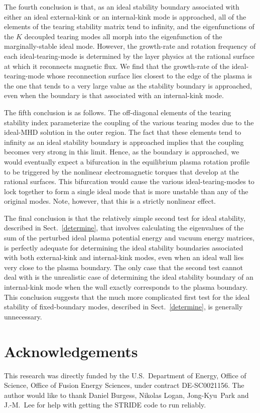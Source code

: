 \documentclass[12pt,prb,aps]{revtex4-1}
\begin{document}
The fourth conclusion is that, as an ideal stability boundary associated with either an ideal external-kink or an internal-kink
mode is approached, all of the elements of the tearing stability matrix tend to infinity, and the eigenfunctions of the $K$ decoupled tearing modes
all morph into the eigenfunction of the marginally-stable ideal mode. However, the growth-rate
and rotation frequency of each ideal-tearing-mode is determined by the layer physics at the rational surface at which it reconnects
magnetic flux. We find that the growth-rate of the ideal-tearing-mode whose reconnection surface lies closest to the edge of the plasma
 is the one that tends to a very large value as the stability boundary is approached, even when the boundary is that associated
with an internal-kink mode. 

The fifth conclusion is as follows. The off-diagonal elements of the tearing stability index parameterize the coupling of the
various tearing modes due to the ideal-MHD solution in the outer region. The fact that these elements tend to infinity as
an ideal stability boundary is approached implies that the coupling becomes very strong in this limit. Hence, as the boundary is
approached, we would eventually expect  a bifurcation in the equilibrium plasma  rotation profile to be triggered  by the nonlinear electromagnetic
torques that develop at the rational surfaces.\cite{am1,bif} This bifurcation would cause the various ideal-tearing-modes to
lock together to form a single ideal mode that is more unstable than any of the original modes. Note, however,  that this is a strictly nonlinear effect. 

The final conclusion is that the relatively simple second test for ideal stability, described in Sect.~\ref{determine}, that involves calculating
the eigenvalues of the sum of the perturbed ideal plasma potential energy and vacuum energy matrices,\cite{dcon} is perfectly adequate for
determining the ideal stability boundaries associated with both external-kink and internal-kink modes, even when an ideal wall lies
very close to the plasma boundary. The only case that the second test cannot deal with is the unrealistic case of determining
the ideal stability boundary of an internal-kink mode when the wall exactly corresponds to the plasma boundary. This conclusion  suggests
that the much more complicated first test for the ideal stability of fixed-boundary modes,\cite{dcon} described in Sect.~\ref{determine}, is generally unnecessary. 

\section*{Acknowledgements}
This research was directly funded by the U.S.\ Department of Energy, Office of Science, Office of Fusion Energy Sciences, under  contract DE-SC0021156. 
The author would like to thank Daniel Burgess, Nikolas Logan, Jong-Kyu~Park and J.-M.~Lee for help with getting the STRIDE code to
run reliably. 
\end{document}

